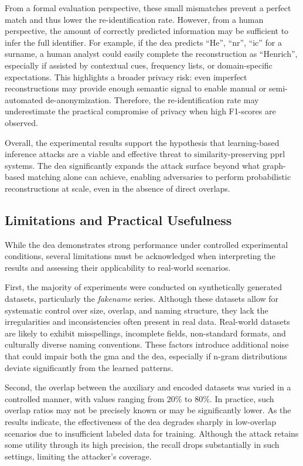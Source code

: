 From a formal evaluation perspective, these small mismatches prevent a perfect match and thus lower the re-identification rate.
However, from a human perspective, the amount of correctly predicted information may be sufficient to infer the full identifier.
For example, if the \ac{dea} predicts ``He'', ``nr'', ``ic'' for a surname, a human analyst could easily complete the reconstruction as ``Henrich'', especially if assisted by contextual cues, frequency lists, or domain-specific expectations.
This highlights a broader privacy risk: even imperfect reconstructions may provide enough semantic signal to enable manual or semi-automated de-anonymization.
Therefore, the re-identification rate may underestimate the practical compromise of privacy when high F1-scores are observed.

Overall, the experimental results support the hypothesis that learning-based inference attacks are a viable and effective threat to similarity-preserving \ac{pprl} systems.
The \ac{dea} significantly expands the attack surface beyond what graph-based matching alone can achieve, enabling adversaries to perform probabilistic reconstructions at scale, even in the absence of direct overlaps.


\subsection{Limitations and Practical Usefulness}

While the \ac{dea} demonstrates strong performance under controlled experimental conditions, several limitations must be acknowledged when interpreting the results and assessing their applicability to real-world scenarios.

First, the majority of experiments were conducted on synthetically generated datasets, particularly the \textit{fakename} series.
Although these datasets allow for systematic control over size, overlap, and naming structure, they lack the irregularities and inconsistencies often present in real data.
Real-world datasets are likely to exhibit misspellings, incomplete fields, non-standard formats, and culturally diverse naming conventions.
These factors introduce additional noise that could impair both the \ac{gma} and the \ac{dea}, especially if n-gram distributions deviate significantly from the learned patterns.

Second, the overlap between the auxiliary and encoded datasets was varied in a controlled manner, with values ranging from 20\% to 80\%.
In practice, such overlap ratios may not be precisely known or may be significantly lower.
As the results indicate, the effectiveness of the \ac{dea} degrades sharply in low-overlap scenarios due to insufficient labeled data for training.
Although the attack retains some utility through its high precision, the recall drops substantially in such settings, limiting the attacker's coverage.

